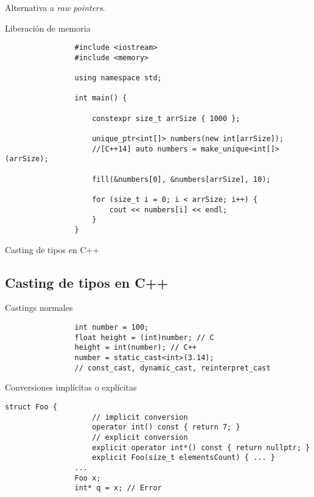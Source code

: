 \documentclass{beamer}
\newcommand{\normalSizeItem}[1] {
  \normalsize{\item #1}
}
\begin{document}
		\begin{frame}[fragile]{Alternativa a \textit{raw pointers}. }	
			\begin{itemize}
			
				\normalSizeItem { Liberación de memoria }
				\begin{lstlisting}
				#include <iostream>
				#include <memory>
				
				using namespace std;
				
				int main() {	
					
					constexpr size_t arrSize { 1000 };
					
					unique_ptr<int[]> numbers(new int[arrSize]);
					//[C++14] auto numbers = make_unique<int[]>(arrSize);
					
					fill(&numbers[0], &numbers[arrSize], 10);
					
					for (size_t i = 0; i < arrSize; i++) {
						cout << numbers[i] << endl;
					}
				}
				\end{lstlisting}				
			\end{itemize}
		\end{frame}
		
		\begin{frame}[fragile]{Casting de tipos en C++}	
			\subsection{Casting de tipos en C++}		
			\begin{itemize}
			
				\normalSizeItem { Castings normales }
				\begin{lstlisting}
				int number = 100;
				float height = (int)number; // C
				height = int(number); // C++
				number = static_cast<int>(3.14);
				// const_cast, dynamic_cast, reinterpret_cast
				\end{lstlisting}
				
				\normalSizeItem { Conversiones implícitas o explícitas }
				\begin{lstlisting}[basicstyle={\tiny\ttfamily}]
				struct Foo {
					// implicit conversion
					operator int() const { return 7; } 
					// explicit conversion
					explicit operator int*() const { return nullptr; }   
					explicit Foo(size_t elementsCount) { ... }
				...
				Foo x;
				int* q = x; // Error
				\end{lstlisting}
				
			\end{itemize}
		\end{frame}
		
\end{document}
